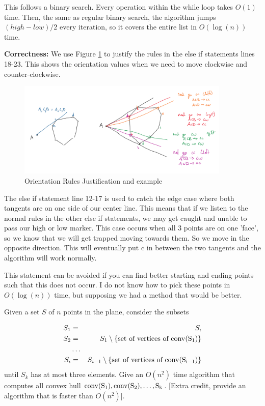\documentclass[11pt]{article}
\newcommand{\conv}[1]{\rm{conv}(#1)}
\begin{document}
This follows a binary search. Every operation within the while loop takes $O(1)$ time. Then, the same as regular binary search,
the algorithm jumps $(high-low)/2$ every iteration, so it covers the entire list in $O(\log (n))$ time. 

\textbf{Correctness:} 
We use Figure \ref{fig:orientation} to justify the rules in the else if statements lines 18-23.
This shows the orientation values when we need to move clockwise and counter-clockwise.
\begin{figure}[h]
    \centering
    \includegraphics[width=0.9\textwidth]{prob_3_correctness.png}
    \caption{Orientation Rules Justification and example}
    \label{fig:orientation}
\end{figure}

The else if statement line 12-17 is used to catch the edge case where both tangents are on one side of our center line.
This means that if we listen to the normal rules in the other else if statements, we may get caught and unable to pass our high or low marker. 
This case occurs when all 3 points are on one 'face', so we know that we will get trapped moving towards them.
So we move in the opposite direction. This will eventually put c in between the two tangents and the algorithm will work normally.

This statement can be avoided if you can find better starting and ending points such that this does not occur.
I do not know how to pick these points in $O(\log (n))$ time, but supposing we had a method that would be better.


Given a set $S$ of $n$ points in the plane, consider the subsets

\begin{eqnarray*}
	S_1 &=& S, \\
	S_2 &=& S_1 \setminus \{ \text{set of vertices of } \conv{S_1} \} \\
		&\ldots& \\
	S_i &=& S_{i-1} \setminus \{ \text{set of vertices of } \conv{S_{i-1}} \}
\end{eqnarray*}
%
until $S_k$ has at most three elements.  Give an $O(n^2)$ time algorithm that
computes all convex hull $\conv{S_1}, \conv{S_2}, \ldots, S_k$.  [Extra credit,
provide an algorithm that is faster than $O(n^2)$].
\end{document}
